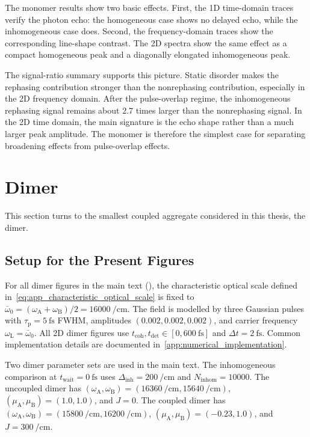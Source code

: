 The monomer results show two basic effects. First, the 1D time-domain traces verify the photon echo: the homogeneous case shows no delayed echo, while the inhomogeneous case does. Second, the frequency-domain traces show the corresponding line-shape contrast. The 2D spectra show the same effect as a compact homogeneous peak and a diagonally elongated inhomogeneous peak.

The signal-ratio summary supports this picture. Static disorder makes the rephasing contribution stronger than the nonrephasing contribution, especially in the 2D frequency domain. After the pulse-overlap regime, the inhomogeneous rephasing signal remains about \(2.7\) times larger than the nonrephasing signal. In the 2D time domain, the main signature is the echo shape rather than a much larger peak amplitude. The monomer is therefore the simplest case for separating broadening effects from pulse-overlap effects.

\section{Dimer}
\label{sec:results_dimer}

This section turns to the smallest coupled aggregate considered in this
thesis, the dimer.

\subsection{Setup for the Present Figures}
\label{subsec:results_dimer_model}

For all dimer figures in the main text
(),
the characteristic optical scale defined
in~\autoref{eq:app_characteristic_optical_scale} is fixed to
\(\bar{\omega}_0=(\omega_{\mathrm{A}}+\omega_{\mathrm{B}})/2=\SI{16000}{\per\centi\metre}\).
The field is modelled by three Gaussian pulses with
\(\tau_{\mathrm{p}}=\SI{5}{\femto\second}\) FWHM, amplitudes
\((0.002,0.002,0.002)\), and carrier frequency \(\omega_{\mathrm{L}}=\bar{\omega}_0\).
All 2D dimer figures use
\(t_{\mathrm{coh}},t_{\mathrm{det}}\in[0,\SI{600}{\femto\second}]\) and
\(\Delta t=\SI{2}{\femto\second}\). Common implementation details are
documented in~\autoref{app:numerical_implementation}.

Two dimer parameter sets are used in the main text. The inhomogeneous
comparison at \(t_{\mathrm{wait}}=\SI{0}{\femto\second}\) uses
\(\Delta_{\mathrm{inh}}=\SI{200}{\per\centi\metre}\) and
\(N_{\mathrm{inhom}}=10000\). The uncoupled dimer has
\((\omega_{\mathrm{A}},\omega_{\mathrm{B}})=(\SI{16360}{\per\centi\metre},\SI{15640}{\per\centi\metre})\),
\((\mu_{\mathrm{A}},\mu_{\mathrm{B}})=(1.0,1.0)\), and \(J=0\). The coupled
dimer has
\((\omega_{\mathrm{A}},\omega_{\mathrm{B}})=(\SI{15800}{\per\centi\metre},\SI{16200}{\per\centi\metre})\),
\((\mu_{\mathrm{A}},\mu_{\mathrm{B}})=(-0.23,1.0)\), and
\(J=\SI{300}{\per\centi\metre}\).

